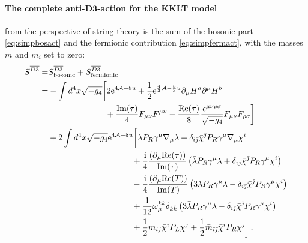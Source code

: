 \documentclass[a4paper,12pt,twoside,openright]{report}
\newcommand{\bea}{\begin{equation}\begin{aligned}}
\newcommand{\eea}{\end{aligned}\end{equation}}
\def\rmi{{\rm i}}
\def\rme{{\rm e}}
\def\ib{{\bar \imath}}
\def\jb{{\bar \jmath}}
\def\rmre{{\rm Re}}
\def\rmim{{\rm Im}}
\begin{document}
\paragraph{The complete anti-$\mathbf{D3}$-action for the KKLT model} from the perspective of string theory is the sum of the bosonic part \eqref{eq:simpbosact} and the fermionic contribution \eqref{eq:simpfermact}, with the masses $m$ and $m_i$ set to zero:
\bea 
S^{\overline{D3}} 
=& S^{\overline{D3}}_{\text{bosonic}} + S^{\overline{D3}}_{\text{fermionic}}\\
=& - \int d^4x \sqrt{-g_4} \bigg[ 2 \rme^{4\mathcal{A}-8u} + \frac{1}{2} \rme^{\frac{4}{3} \mathcal{A}-\frac{8}{3}u}\partial_\mu H^a \partial^\mu \bar{H}^{\bar{b}}\\
&\qquad\qquad\qquad\;\;\; + \frac{\rmim(\tau)}{4} F_{\mu\nu}F^{\mu\nu} - \frac{\rmre(\tau)}{8} \frac{\epsilon^{\mu\nu\rho\sigma}}{\sqrt{-g_4}} F_{\mu\nu}F_{\rho\sigma}\bigg]\\
& + 2 \int d^4x \sqrt{-g_4} \rme^{4\mathcal{A}-8u} \bigg[ \bar{\lambda} P_R \gamma^\mu \nabla_\mu \lambda + \delta_{i\jb} \bar{\chi}^\jb P_R \gamma^\mu \nabla_\mu \chi^i\\
&\qquad\qquad\qquad\qquad\qquad + \frac{\rmi}{4} \frac{\left(\partial_\mu \rmre(\tau)\right)}{\rmim(\tau)} \left( \bar{\lambda} P_R \gamma^\mu \lambda + \delta_{i\jb} \bar{\chi}^\jb P_R \gamma^\mu \chi^i\right)\\
&\qquad\qquad\qquad\qquad\qquad - \frac{\rmi}{4} \frac{\left(\partial_\mu \rmre(T)\right)}{\rmim(T)} \left(3 \bar{\lambda} P_R \gamma^\mu \lambda - \delta_{i\jb} \bar{\chi}^\jb P_R \gamma^\mu \chi^i\right)\\
&\qquad\qquad\qquad\qquad\qquad + \frac{1}{12} \omega_\mu^{k\bar{k}} \delta_{k\bar{k}} \left(3 \bar{\lambda} P_R \gamma^\mu \lambda - \delta_{i\jb} \bar{\chi}^\jb P_R \gamma^\mu \chi^i\right)\\
&\qquad\qquad\qquad\qquad\qquad + \frac{1}{2} m_{ij} \bar{\chi}^i P_L \chi^j + \frac{1}{2} \bar{m}_{\ib\jb} \bar{\chi}^\ib P_R \chi^\jb\bigg]\,.
\label{eq:simpbraneact}
\eea
\end{document}
